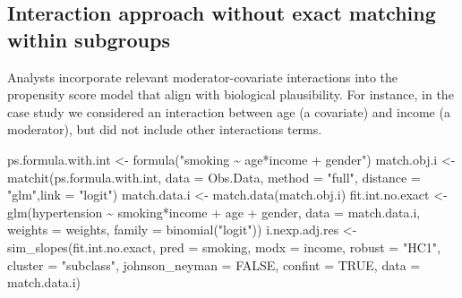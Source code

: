 \documentclass[
  letterpaper,
  DIV=11,
  numbers=noendperiod]{scrreprt}
\newenvironment{Shaded}{\begin{snugshade}}{\end{snugshade}}
\newcommand{\AttributeTok}[1]{\textcolor[rgb]{0.40,0.45,0.13}{#1}}
\newcommand{\ConstantTok}[1]{\textcolor[rgb]{0.56,0.35,0.01}{#1}}
\newcommand{\FunctionTok}[1]{\textcolor[rgb]{0.28,0.35,0.67}{#1}}
\newcommand{\NormalTok}[1]{\textcolor[rgb]{0.00,0.23,0.31}{#1}}
\newcommand{\OtherTok}[1]{\textcolor[rgb]{0.00,0.23,0.31}{#1}}
\newcommand{\SpecialCharTok}[1]{\textcolor[rgb]{0.37,0.37,0.37}{#1}}
\newcommand{\StringTok}[1]{\textcolor[rgb]{0.13,0.47,0.30}{#1}}
\begin{document}
\hypertarget{interaction-approach-without-exact-matching-within-subgroups}{%
\subsection{Interaction approach without exact matching within
subgroups}\label{interaction-approach-without-exact-matching-within-subgroups}}

Analysts incorporate relevant moderator-covariate interactions into the
propensity score model that align with biological plausibility. For
instance, in the case study we considered an interaction between age (a
covariate) and income (a moderator), but did not include other
interactions terms.

\begin{Shaded}
\begin{Highlighting}[]
\NormalTok{ps.formula.with.int }\OtherTok{\textless{}{-}} \FunctionTok{formula}\NormalTok{(}\StringTok{"smoking \textasciitilde{} age*income + gender"}\NormalTok{)}
\NormalTok{match.obj.i }\OtherTok{\textless{}{-}} \FunctionTok{matchit}\NormalTok{(ps.formula.with.int, }\AttributeTok{data =}\NormalTok{ Obs.Data,}
                       \AttributeTok{method =} \StringTok{"full"}\NormalTok{, }\AttributeTok{distance =} \StringTok{"glm"}\NormalTok{,}\AttributeTok{link =} \StringTok{"logit"}\NormalTok{)}
\NormalTok{match.data.i }\OtherTok{\textless{}{-}} \FunctionTok{match.data}\NormalTok{(match.obj.i)}
\NormalTok{fit.int.no.exact }\OtherTok{\textless{}{-}} \FunctionTok{glm}\NormalTok{(hypertension }\SpecialCharTok{\textasciitilde{}}\NormalTok{ smoking}\SpecialCharTok{*}\NormalTok{income }\SpecialCharTok{+}\NormalTok{ age }\SpecialCharTok{+}\NormalTok{ gender, }
                        \AttributeTok{data =}\NormalTok{ match.data.i, }\AttributeTok{weights =}\NormalTok{ weights,}
                        \AttributeTok{family =} \FunctionTok{binomial}\NormalTok{(}\StringTok{"logit"}\NormalTok{))}
\NormalTok{i.nexp.adj.res }\OtherTok{\textless{}{-}} \FunctionTok{sim\_slopes}\NormalTok{(fit.int.no.exact, }
                             \AttributeTok{pred =}\NormalTok{ smoking, }\AttributeTok{modx =}\NormalTok{ income,}
                             \AttributeTok{robust =} \StringTok{"HC1"}\NormalTok{, }\AttributeTok{cluster =} \StringTok{"subclass"}\NormalTok{,}
                             \AttributeTok{johnson\_neyman =} \ConstantTok{FALSE}\NormalTok{, }\AttributeTok{confint =} \ConstantTok{TRUE}\NormalTok{,}
                             \AttributeTok{data =}\NormalTok{ match.data.i)}
\end{Highlighting}
\end{Shaded}
\end{document}
